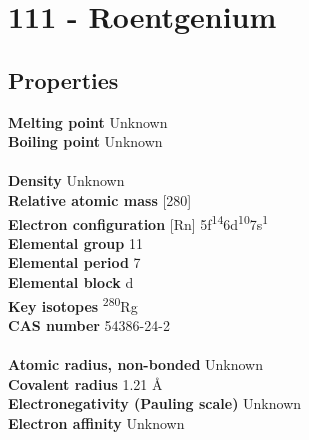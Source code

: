 \section{111 - Roentgenium}
\label{sec:elem-roentgenium}
\subsection{Properties}
\textbf{Melting point} Unknown\\
\textbf{Boiling point} Unknown\\
\\
\textbf{Density} Unknown\\
\textbf{Relative atomic mass} [280]\\
\textbf{Electron configuration} [Rn] 5f\textsuperscript{14}6d\textsuperscript{10}7s\textsuperscript{1}\\
\textbf{Elemental group} 11\\
\textbf{Elemental period} 7\\
\textbf{Elemental block} d\\
\textbf{Key isotopes} \textsuperscript{280}Rg\\
\textbf{CAS number} 54386-24-2\\
\\
\textbf{Atomic radius, non-bonded} Unknown\\
\textbf{Covalent radius} 1.21 Å\\
\textbf{Electronegativity (Pauling scale)} Unknown\\
\textbf{Electron affinity} Unknown\\